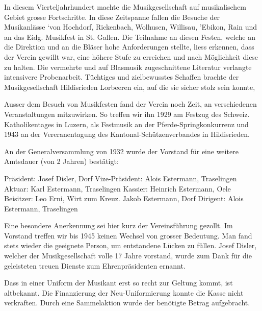 \begin{history}


    In diesem Vierteljahrhundert machte die Musikgesellschaft auf musikalischem
    Gebiet grosse Fortschritte. In diese Zeitspanne fallen die Besuche der
    Musikanlässe ‘von Hochdorf, Rickenbach, Wolhusen, Willisau, 'Ebikon, Rain
    und an das Eidg. Musikfest in St. Gallen. Die Teilnahme an diesen Festen,
    welche an die Direktion und an die Bläser hohe Anforderungen stellte, liess
    erkennen, dass der Verein gewillt war, eine höhere Stufe zu erreichen und
    nach Möglichkeit diese zu halten. Die vermehrte und auf Blasmusik
    zugeschnittene Literatur verlangte intensivere Probenarbeit. Tüchtiges und
    zielbewusstes Schaffen brachte der Musikgesellschaft Hildisrieden Lorbeeren
    ein, auf die sie sicher stolz sein konnte,

    Ausser dem Besuch von Musikfesten fand der Verein noch Zeit, an
    verschiedenen Veranstaltungen mitzuwirken. So treffen wir ihn 1929 am
    Festzug des Schweiz. Katholikentages in Luzern, als Festmusik an der
    Pferde-Springkonkurrenz und 1943 an der Vereranentagung des
    Kantonal-Schützenverbandes in Hildisrieden.

    An der Generalversammlung von 1932 wurde der Vorstand für eine weitere
    Amtsdauer (von 2 Jahren) bestätigt:

    Präsident: Josef Disler, Dorf Vize-Präsident: Alois Estermann, Traselingen
    Aktuar: Karl Estermann, Traselingen Kassier: Heinrich Estermann, Oele
    Beisitzer: Leo Erni, Wirt zum Kreuz. Jakob Estermann, Dorf Dirigent: Alois
    Estermann, Traselingen


    Eine besondere Anerkennung sei hier kurz der Vereinsführung gezollt. Im
    Vorstand treffen wir bis 1945 keinen Wechsel von grosser Bedeutung. Man fand
    stets wieder die geeignete Person, um entstandene Lücken zu füllen. Josef
    Disler, welcher der Musikgesellschaft volle 17 Jahre vorstand, wurde zum
    Dank für die geleisteten treuen Dienste zum Ehrenpräsidenten ernannt.

    Dass in einer Uniform der Musikant erst so recht zur Geltung kommt, ist
    altbekannt. Die Finanzierung der Neu-Uniformierung konnte die Kasse nicht
    verkraften. Durch eine Sammelaktion wurde der benötigte Betrag aufgebracht.


\end{history}
